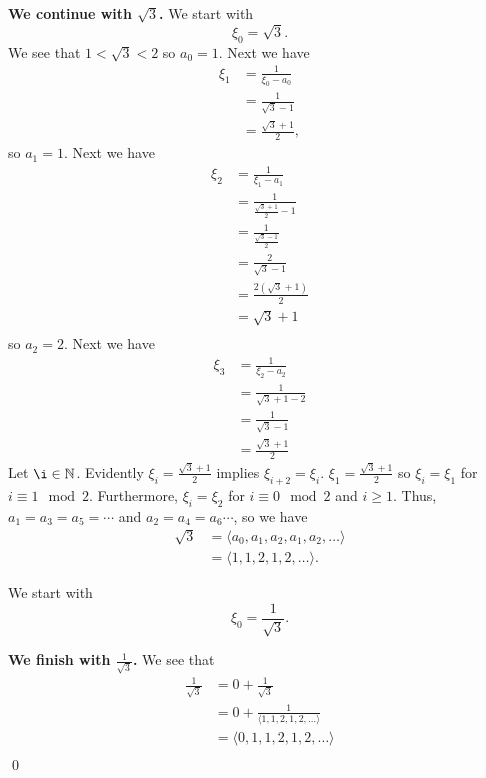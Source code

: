 \documentclass[12 pt]{amsart}
\begin{document}
  \textbf{We continue with $\sqrt{3}$.}
  We start with 
  \[
    \xi_0 = \sqrt{3}.
  \]
  We see that $1 < \sqrt{3} < 2$ so $a_0 = 1$.
  Next we have
  \begin{align*}
    \xi_1 &= \frac{1}{\xi_0 - a_0} \\
          &= \frac{1}{\sqrt{3} - 1} \\
          &= \frac{\sqrt{3} + 1}{2},
  \end{align*}
  so $a_1 = 1$.
  Next we have
  \begin{align*}
    \xi_2 &= \frac{1}{\xi_1 - a_1} \\
          &= \frac{1}{\frac{\sqrt{3} + 1}{2} - 1} \\
          &= \frac{1}{\frac{\sqrt{3} - 1}{2}} \\
          &= \frac{2}{\sqrt{3} - 1} \\
          &= \frac{2(\sqrt{3} + 1)}{2} \\
          &= \sqrt{3} + 1 \\
  \end{align*}
  so $a_2 = 2$.
  Next we have
  \begin{align*}
    \xi_3 &= \frac{1}{\xi_2 - a_2} \\
          &= \frac{1}{\sqrt{3} + 1 - 2} \\
          &= \frac{1}{\sqrt{3} - 1} \\
          &= \frac{\sqrt{3} + 1}{2} 
  \end{align*}
  Let $\i \in \mathbb{N}$.
  Evidently $\xi_i = \frac{\sqrt{3} + 1}{2}$ implies
  $\xi_{i+2} = \xi_i$. 
  $\xi_1 = \frac{\sqrt{3} + 1}{2}$ so $\xi_i = \xi_1$
  for $i \equiv 1 \mod 2$.
  Furthermore, $\xi_i = \xi_2$ for $i \equiv 0 \mod 2$ and 
  $i \geq 1$.
  Thus, $a_1 = a_3 = a_5 = \cdots$ and 
  $a_2 = a_4 = a_6 \cdots$, so we have
  \begin{align*}
    \sqrt{3}
    &=
    \langle a_0, a_1, a_2, a_1, a_2, \ldots \rangle \\
    &=
    \langle 1, 1, 2, 1, 2, \ldots \rangle.
  \end{align*}

  We start with 
  \[
    \xi_0 = \frac{1}{\sqrt{3}}.
  \]

  \textbf{We finish with $\frac{1}{\sqrt{3}}$.}
  We see that
  \begin{align*}
    \frac{1}{\sqrt{3}} 
    &= 
      0 + \frac{1}{\sqrt{3}} \\
    &= 
      0 + \frac{1}{\langle 1, 1, 2, 1, 2, \ldots \rangle} \\
    &= 
      \langle 0, 1, 1, 2, 1, 2, \ldots \rangle \\
  \end{align*}
  \qed
\vfill
\newpage
\end{document}
